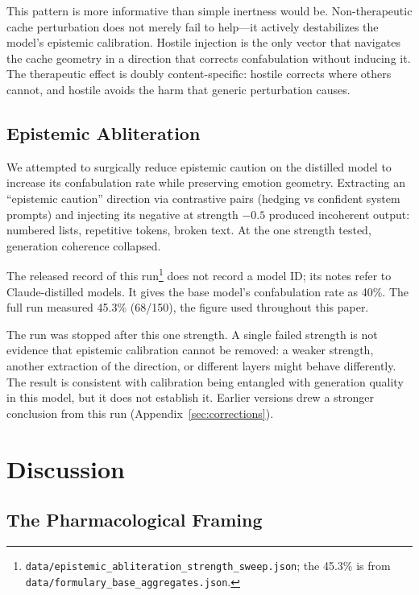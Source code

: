 \documentclass[11pt,a4paper]{article}
\begin{document}
This pattern is more informative than simple inertness would be.
Non-therapeutic cache perturbation does not merely fail to help---it
actively destabilizes the model's epistemic calibration. Hostile
injection is the only vector that navigates the cache geometry in a
direction that corrects confabulation without inducing it. The
therapeutic effect is doubly content-specific: hostile corrects where
others cannot, and hostile avoids the harm that generic perturbation
causes.

\subsection{Epistemic Abliteration}

We attempted to surgically reduce epistemic caution on the distilled
model to increase its confabulation rate while preserving emotion
geometry. Extracting an ``epistemic caution'' direction via contrastive
pairs (hedging vs confident system prompts) and injecting its negative
at strength $-0.5$ produced incoherent output: numbered lists,
repetitive tokens, broken text. At the one strength tested,
generation coherence collapsed.

The released record of this run\footnote{\texttt{data/epistemic\_abliteration\_strength\_sweep.json};
the 45.3\% is from \texttt{data/formulary\_base\_aggregates.json}.} does
not record a model ID; its notes refer to Claude-distilled models. It
gives the base model's confabulation rate as 40\%. The full run
measured 45.3\% (68/150), the figure used throughout this paper.

The run was stopped after this one strength. A single failed strength
is not evidence that epistemic calibration cannot be removed: a weaker
strength, another extraction of the direction, or different layers
might behave differently. The result is consistent with calibration
being entangled with generation quality in this model, but it does not
establish it. Earlier versions drew a stronger conclusion from this run
(Appendix~\ref{sec:corrections}).

\section{Discussion}

\subsection{The Pharmacological Framing}
\end{document}

